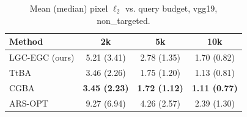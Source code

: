 \begin{table}[t]
\centering\footnotesize
\caption{Mean (median) pixel $\ell_2$ vs. query budget, vgg19, non\_targeted.}
\begin{tabular}{lccc}
\toprule
Method & 2k & 5k & 10k \\
\midrule
LGC-EGC (ours) & 5.21 (3.41) & 2.78 (1.35) & 1.70 (0.82) \\
TtBA & 3.46 (2.26) & 1.75 (1.20) & 1.13 (0.81) \\
CGBA & \textbf{3.45 (2.23)} & \textbf{1.72 (1.12)} & \textbf{1.11 (0.77)} \\
ARS-OPT & 9.27 (6.94) & 4.26 (2.57) & 2.39 (1.30) \\
\bottomrule
\end{tabular}
\end{table}
